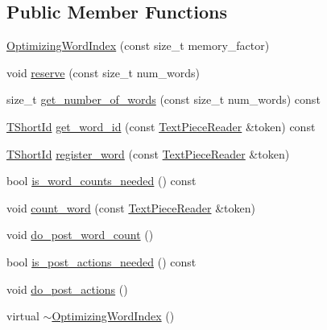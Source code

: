 \subsection*{Public Member Functions}
\begin{DoxyCompactItemize}
\item 
\hyperlink{classuva_1_1smt_1_1tries_1_1dictionary_1_1_optimizing_word_index_a3b8aa990378a06935d58fe743749d435}{Optimizing\+Word\+Index} (const size\+\_\+t memory\+\_\+factor)
\item 
void \hyperlink{classuva_1_1smt_1_1tries_1_1dictionary_1_1_optimizing_word_index_a29e99786937910cfdd51bc01647e93a1}{reserve} (const size\+\_\+t num\+\_\+words)
\item 
size\+\_\+t \hyperlink{classuva_1_1smt_1_1tries_1_1dictionary_1_1_optimizing_word_index_a18bbeb4a68a29f099b5aff1c0432017f}{get\+\_\+number\+\_\+of\+\_\+words} (const size\+\_\+t num\+\_\+words) const 
\item 
\hyperlink{namespaceuva_1_1smt_1_1hashing_adcf22e1982ad09d3a63494c006267469}{T\+Short\+Id} \hyperlink{classuva_1_1smt_1_1tries_1_1dictionary_1_1_optimizing_word_index_a33f7148d6dbb5d23695f84ab58b3aea8}{get\+\_\+word\+\_\+id} (const \hyperlink{classuva_1_1smt_1_1file_1_1_text_piece_reader}{Text\+Piece\+Reader} \&token) const 
\item 
\hyperlink{namespaceuva_1_1smt_1_1hashing_adcf22e1982ad09d3a63494c006267469}{T\+Short\+Id} \hyperlink{classuva_1_1smt_1_1tries_1_1dictionary_1_1_optimizing_word_index_a759066cb412904184a24d1fec3fa032d}{register\+\_\+word} (const \hyperlink{classuva_1_1smt_1_1file_1_1_text_piece_reader}{Text\+Piece\+Reader} \&token)
\item 
bool \hyperlink{classuva_1_1smt_1_1tries_1_1dictionary_1_1_optimizing_word_index_aa99b4464afe3e74bf781193f460917b4}{is\+\_\+word\+\_\+counts\+\_\+needed} () const 
\item 
void \hyperlink{classuva_1_1smt_1_1tries_1_1dictionary_1_1_optimizing_word_index_aab1a79cb1c277c521f4cc113010ab0c0}{count\+\_\+word} (const \hyperlink{classuva_1_1smt_1_1file_1_1_text_piece_reader}{Text\+Piece\+Reader} \&token)
\item 
void \hyperlink{classuva_1_1smt_1_1tries_1_1dictionary_1_1_optimizing_word_index_a705e6db93fd8cc8aed084185dcf26def}{do\+\_\+post\+\_\+word\+\_\+count} ()
\item 
bool \hyperlink{classuva_1_1smt_1_1tries_1_1dictionary_1_1_optimizing_word_index_a082bdf40e6a1d62e64f158f8ac1ede34}{is\+\_\+post\+\_\+actions\+\_\+needed} () const 
\item 
void \hyperlink{classuva_1_1smt_1_1tries_1_1dictionary_1_1_optimizing_word_index_a7d2071ce9deebb852af7dd91d572b8e5}{do\+\_\+post\+\_\+actions} ()
\item 
virtual \hyperlink{classuva_1_1smt_1_1tries_1_1dictionary_1_1_optimizing_word_index_a3a07ad08e4e3ba7524b8d2aa706eb694}{$\sim$\+Optimizing\+Word\+Index} ()
\end{DoxyCompactItemize}
